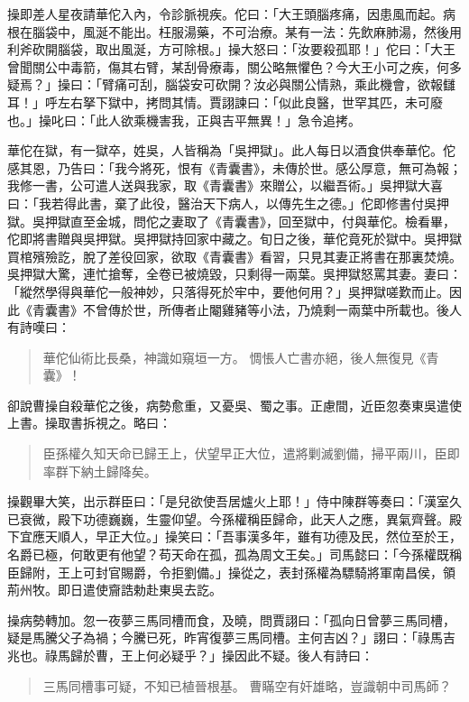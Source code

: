 操即差人星夜請華佗入內，令診脈視疾。佗曰：「大王頭腦疼痛，因患風而起。病根在腦袋中，風涎不能出。枉服湯藥，不可治療。某有一法：先飲麻肺湯，然後用利斧砍開腦袋，取出風涎，方可除根。」操大怒曰：「汝要殺孤耶！」佗曰：「大王曾聞關公中毒箭，傷其右臂，某刮骨療毒，關公略無懼色？今大王小可之疾，何多疑焉？」操曰：「臂痛可刮，腦袋安可砍開？汝必與關公情熟，乘此機會，欲報讎耳！」呼左右拏下獄中，拷問其情。賈詡諫曰：「似此良醫，世罕其匹，未可廢也。」操叱曰：「此人欲乘機害我，正與吉平無異！」急令追拷。

華佗在獄，有一獄卒，姓吳，人皆稱為「吳押獄」。此人每日以酒食供奉華佗。佗感其恩，乃告曰：「我今將死，恨有《青囊書》，未傳於世。感公厚意，無可為報；我修一書，公可遣人送與我家，取《青囊書》來贈公，以繼吾術。」吳押獄大喜曰：「我若得此書，棄了此役，醫治天下病人，以傳先生之德。」佗即修書付吳押獄。吳押獄直至金城，問佗之妻取了《青囊書》，回至獄中，付與華佗。檢看畢，佗即將書贈與吳押獄。吳押獄持回家中藏之。旬日之後，華佗竟死於獄中。吳押獄買棺殯殮訖，脫了差役回家，欲取《青囊書》看習，只見其妻正將書在那裏焚燒。吳押獄大驚，連忙搶奪，全卷已被燒毀，只剩得一兩葉。吳押獄怒罵其妻。妻曰：「縱然學得與華佗一般神妙，只落得死於牢中，要他何用？」吳押獄嗟歎而止。因此《青囊書》不曾傳於世，所傳者止閹雞豬等小法，乃燒剩一兩葉中所載也。後人有詩嘆曰：

\begin{quote}
華佗仙術比長桑，神識如窺垣一方。
惆悵人亡書亦絕，後人無復見《青囊》！
\end{quote}

卻說曹操自殺華佗之後，病勢愈重，又憂吳、蜀之事。正慮間，近臣忽奏東吳遣使上書。操取書拆視之。略曰：

\begin{quote}
臣孫權久知天命已歸王上，伏望早正大位，遣將剿滅劉備，掃平兩川，臣即率群下納土歸降矣。
\end{quote}

操觀畢大笑，出示群臣曰：「是兒欲使吾居爐火上耶！」侍中陳群等奏曰：「漢室久已衰微，殿下功德巍巍，生靈仰望。今孫權稱臣歸命，此天人之應，異氣齊聲。殿下宜應天順人，早正大位。」操笑曰：「吾事漢多年，雖有功德及民，然位至於王，名爵已極，何敢更有他望？苟天命在孤，孤為周文王矣。」司馬懿曰：「今孫權既稱臣歸附，王上可封官賜爵，令拒劉備。」操從之，表封孫權為驃騎將軍南昌侯，領荊州牧。即日遣使齎誥勅赴東吳去訖。

操病勢轉加。忽一夜夢三馬同槽而食，及曉，問賈詡曰：「孤向日曾夢三馬同槽，疑是馬騰父子為禍；今騰已死，昨宵復夢三馬同槽。主何吉凶？」詡曰：「祿馬吉兆也。祿馬歸於曹，王上何必疑乎？」操因此不疑。後人有詩曰：

\begin{quote}
三馬同槽事可疑，不知已植晉根基。
曹瞞空有奸雄略，豈識朝中司馬師？
\end{quote}

